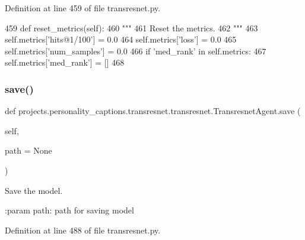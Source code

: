 Definition at line 459 of file transresnet.\+py.


\begin{DoxyCode}
459     \textcolor{keyword}{def }reset\_metrics(self):
460         \textcolor{stringliteral}{"""}
461 \textcolor{stringliteral}{        Reset the metrics.}
462 \textcolor{stringliteral}{        """}
463         self.metrics[\textcolor{stringliteral}{'hits@1/100'}] = 0.0
464         self.metrics[\textcolor{stringliteral}{'loss'}] = 0.0
465         self.metrics[\textcolor{stringliteral}{'num\_samples'}] = 0.0
466         \textcolor{keywordflow}{if} \textcolor{stringliteral}{'med\_rank'} \textcolor{keywordflow}{in} self.metrics:
467             self.metrics[\textcolor{stringliteral}{'med\_rank'}] = []
468 
\end{DoxyCode}
\mbox{\label{classprojects_1_1personality__captions_1_1transresnet_1_1transresnet_1_1TransresnetAgent_a9bacab7aeb7c9f795c72ee7d36867ee4}} 
\subsubsection{\texorpdfstring{save()}{save()}}
{\footnotesize\ttfamily def projects.\+personality\+\_\+captions.\+transresnet.\+transresnet.\+Transresnet\+Agent.\+save (\begin{DoxyParamCaption}\item[{}]{self,  }\item[{}]{path = {\ttfamily None} }\end{DoxyParamCaption})}

\begin{DoxyVerb}Save the model.

:param path:
    path for saving model
\end{DoxyVerb}
 

Definition at line 488 of file transresnet.\+py.


